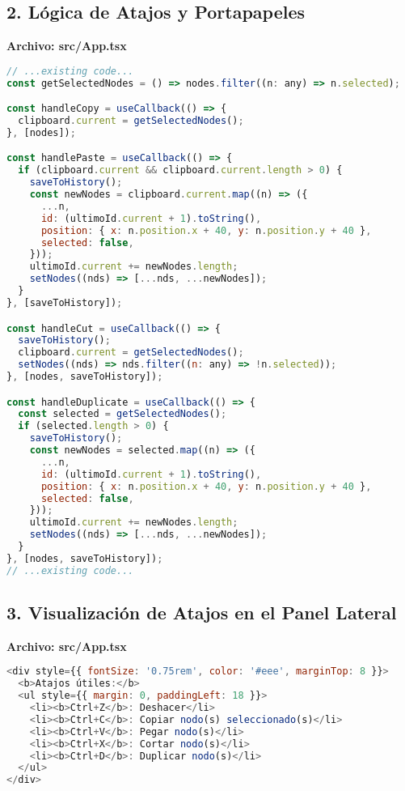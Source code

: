 \documentclass{article}
\begin{document}
\subsection*{2. Lógica de Atajos y Portapapeles}
\textbf{Archivo: src/App.tsx}
\begin{lstlisting}[language=JavaScript, caption=Fragmento de integración de atajos en App.tsx]
// ...existing code...
const getSelectedNodes = () => nodes.filter((n: any) => n.selected);

const handleCopy = useCallback(() => {
  clipboard.current = getSelectedNodes();
}, [nodes]);

const handlePaste = useCallback(() => {
  if (clipboard.current && clipboard.current.length > 0) {
    saveToHistory();
    const newNodes = clipboard.current.map((n) => ({
      ...n,
      id: (ultimoId.current + 1).toString(),
      position: { x: n.position.x + 40, y: n.position.y + 40 },
      selected: false,
    }));
    ultimoId.current += newNodes.length;
    setNodes((nds) => [...nds, ...newNodes]);
  }
}, [saveToHistory]);

const handleCut = useCallback(() => {
  saveToHistory();
  clipboard.current = getSelectedNodes();
  setNodes((nds) => nds.filter((n: any) => !n.selected));
}, [nodes, saveToHistory]);

const handleDuplicate = useCallback(() => {
  const selected = getSelectedNodes();
  if (selected.length > 0) {
    saveToHistory();
    const newNodes = selected.map((n) => ({
      ...n,
      id: (ultimoId.current + 1).toString(),
      position: { x: n.position.x + 40, y: n.position.y + 40 },
      selected: false,
    }));
    ultimoId.current += newNodes.length;
    setNodes((nds) => [...nds, ...newNodes]);
  }
}, [nodes, saveToHistory]);
// ...existing code...
\end{lstlisting}

\subsection*{3. Visualización de Atajos en el Panel Lateral}
\textbf{Archivo: src/App.tsx}
\begin{lstlisting}[language=JavaScript, caption=Panel lateral con atajos]
<div style={{ fontSize: '0.75rem', color: '#eee', marginTop: 8 }}>
  <b>Atajos útiles:</b>
  <ul style={{ margin: 0, paddingLeft: 18 }}>
    <li><b>Ctrl+Z</b>: Deshacer</li>
    <li><b>Ctrl+C</b>: Copiar nodo(s) seleccionado(s)</li>
    <li><b>Ctrl+V</b>: Pegar nodo(s)</li>
    <li><b>Ctrl+X</b>: Cortar nodo(s)</li>
    <li><b>Ctrl+D</b>: Duplicar nodo(s)</li>
  </ul>
</div>
\end{lstlisting}
\end{document}

